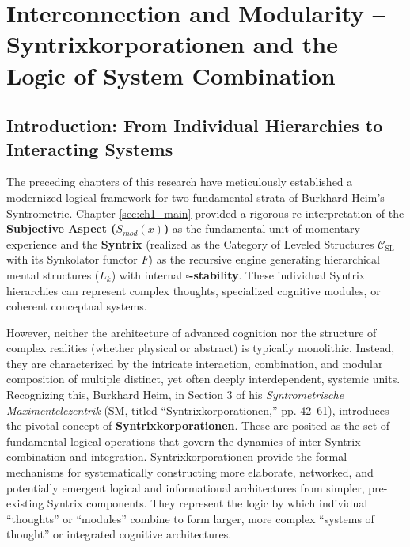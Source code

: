 \documentclass[
    12pt,              %
    a4paper,           %
    headings=normal,   %
    twoside=true,      %
    BCOR=8mm,          %
]{scrbook}
\newcommand{\q}[1]{\enquote{#1}}
\newcommand{\BoxSyn}{\square}
\begin{document}
\chapter{Interconnection and Modularity – Syntrixkorporationen and the Logic of System Combination}
\label{sec:ch3_main}

\section{Introduction: From Individual Hierarchies to Interacting Systems}
\label{sec:ch3_intro}

The preceding chapters of this research have meticulously established a modernized logical framework for two fundamental strata of Burkhard Heim's Syntrometrie. Chapter \ref{sec:ch1_main} provided a rigorous re-interpretation of the \textbf{Subjective Aspect (\(S_{mod}(x)\))} as the fundamental unit of momentary experience and the \textbf{Syntrix} (realized as the Category of Leveled Structures \(\mathcal{C}_{\text{SL}}\) with its Synkolator functor \(F\)) as the recursive engine generating hierarchical mental structures (\(L_k\)) with internal \textbf{\(\BoxSyn\)-stability}. These individual Syntrix hierarchies can represent complex thoughts, specialized cognitive modules, or coherent conceptual systems.

However, neither the architecture of advanced cognition nor the structure of complex realities (whether physical or abstract) is typically monolithic. Instead, they are characterized by the intricate interaction, combination, and modular composition of multiple distinct, yet often deeply interdependent, systemic units. Recognizing this, Burkhard Heim, in Section 3 of his \textit{Syntrometrische Maximentelezentrik} (SM, titled \q{Syntrixkorporationen,} pp. 42–61), introduces the pivotal concept of \textbf{Syntrixkorporationen}. These are posited as the set of fundamental logical operations that govern the dynamics of inter-Syntrix combination and integration. Syntrixkorporationen provide the formal mechanisms for systematically constructing more elaborate, networked, and potentially emergent logical and informational architectures from simpler, pre-existing Syntrix components. They represent the logic by which individual \q{thoughts} or \q{modules} combine to form larger, more complex \q{systems of thought} or integrated cognitive architectures.
\end{document}
